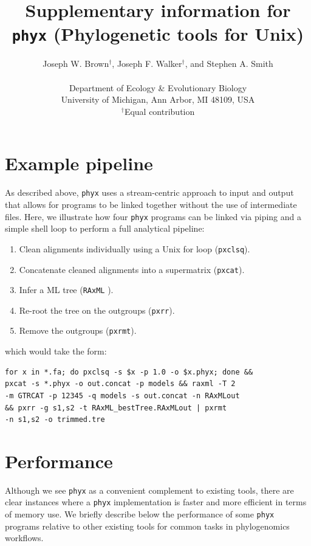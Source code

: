 \documentclass{article}
\begin{document}
\title{Supplementary information for \texttt{phyx} (Phylogenetic tools for Unix)}

\author{Joseph W. Brown$^{\dagger}$, Joseph F. Walker$^{\dagger}$, and Stephen A. Smith\\\\
\normalsize{Department of Ecology \& Evolutionary Biology}\\
\normalsize{University of Michigan, Ann Arbor, MI 48109, USA}\\
\normalsize{$^{\dagger}$Equal contribution}}
\date{} %
\maketitle

\section{Example pipeline}
As described above, \texttt{phyx} uses a stream-centric approach to input and output that allows for programs to be linked together without the use of intermediate files. Here, we illustrate how four \texttt{phyx} programs can be linked via piping
and a simple shell loop to perform a full analytical pipeline:
\begin{enumerate}
\item Clean alignments individually using a Unix for loop (\texttt{pxclsq}).
\item Concatenate cleaned alignments into a supermatrix (\texttt{pxcat}).
\item Infer a ML tree (\texttt{RAxML} \citep{Stamatakis2014}).
\item Re-root the tree on the outgroups (\texttt{pxrr}).
\item Remove the outgroups (\texttt{pxrmt}).
\end{enumerate}
which would take the form:

\begin{verbatim}
for x in *.fa; do pxclsq -s $x -p 1.0 -o $x.phyx; done &&
pxcat -s *.phyx -o out.concat -p models && raxml -T 2
-m GTRCAT -p 12345 -q models -s out.concat -n RAxMLout
&& pxrr -g s1,s2 -t RAxML_bestTree.RAxMLout | pxrmt
-n s1,s2 -o trimmed.tre
\end{verbatim}

\section{Performance}
Although we see \texttt{phyx} as a convenient complement to existing tools, there are clear instances where a \texttt{phyx} implementation is faster and more efficient in terms of memory use. We briefly describe below the performance of some \texttt{phyx} programs relative to other existing tools for common tasks in phylogenomics workflows.
\end{document}

